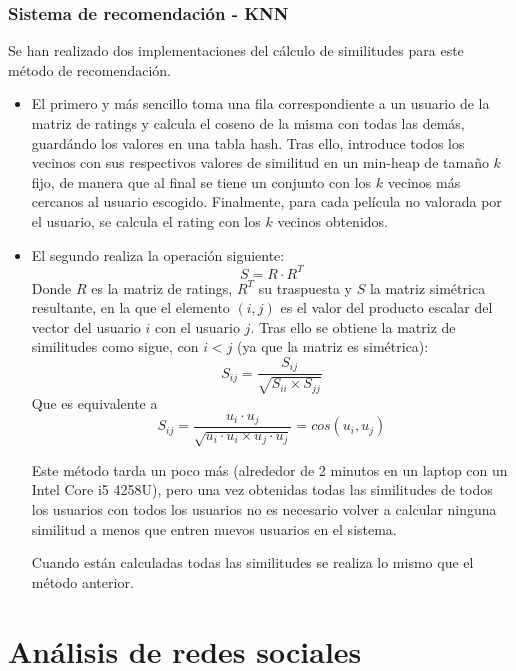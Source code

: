 \documentclass[spanish]{assignment}
\begin{document}
	\subsubsection{Sistema de recomendación - KNN}
	Se han realizado dos implementaciones del cálculo de similitudes para este método de recomendación.
	\begin{itemize}
		\item El primero y más sencillo toma una fila correspondiente a un usuario de la matriz de ratings y calcula el coseno de la misma con todas las demás, guardándo los valores en una tabla hash. Tras ello, introduce todos los vecinos con sus respectivos valores de similitud en un min-heap de tamaño $k$ fijo, de manera que al final se tiene un conjunto con los $k$ vecinos más cercanos al usuario escogido. Finalmente, para cada película no valorada por el usuario, se calcula el rating con los $k$ vecinos obtenidos.
		
		\item El segundo realiza la operación siguiente:
		$$S = R\cdot R^T$$
		Donde $R$ es la matriz de ratings, $R^T$ su traspuesta y $S$ la matriz simétrica resultante, en la que el elemento $(i,j)$ es el valor del producto escalar del vector del usuario $i$ con el usuario $j$.
		Tras ello se obtiene la matriz de similitudes como sigue, con $i<j$ (ya que la matriz es simétrica):
		$$S_{ij} = \frac{S_{ij}}{\sqrt{S_{ii}\times S_{jj}}}$$
		Que es equivalente a
		$$S_{ij} = \frac{u_i\cdot u_j}{\sqrt{u_i\cdot u_i \times u_j \cdot u_j}} = cos(u_i, u_j)$$
		
		Este método tarda un poco más (alrededor de 2 minutos en un laptop con un Intel Core i5 4258U), pero una vez obtenidas todas las similitudes de todos los usuarios con todos los usuarios no es necesario volver a calcular ninguna similitud a menos que entren nuevos usuarios en el sistema.
		
		Cuando están calculadas todas las similitudes se realiza lo mismo que el método anterior.
	\end{itemize}
	
	\section{Análisis de redes sociales}
	
\end{document}
